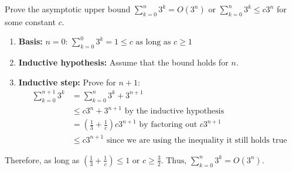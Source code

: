     \begin{example}
        Prove the asymptotic upper bound $\sum_{k=0}^{n} 3^k = O\left(3^n\right)$ or $\sum_{k=0}^{n} 3^k \leq c3^n$ for some constant $c$.
        \begin{enumerate}
            \item \textbf{Basis:} $n = 0 \text{: } \sum_{k=0}^{0} 3^k = 1 \leq c \text{ as long as } c \geq 1$
            \item \textbf{Inductive hypothesis:} Assume that the bound holds for $n$.
            \item \textbf{Inductive step:} Prove for $n+1$: 
            \begin{align*}
                \sum_{k=0}^{n+1} 3^k &= \sum_{k=0}^{n} 3^k + 3^{n+1} \\
                                    &\leq c3^n + 3^{n+1} \text{ by the inductive hypothesis} \\ 
                                    &= \left(\frac{1}{3} + \frac{1}{c}\right) c3^{n+1} \text{ by factoring out } c3^{n+1}\\
                                    &\leq c3^{n+1} \text{ since we are using the inequality it still holds true}
            \end{align*}
        \end{enumerate} 
        Therefore, as long as $\left(\frac{1}{3} + \frac{1}{c}\right) \leq 1 \text{ or } c \geq \frac{3}{2}. \text{ Thus, } \sum_{k=0}^{n} 3^k = O(3^n)$.
    \end{example}

